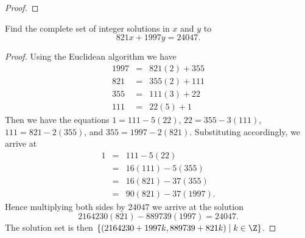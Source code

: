 \documentclass[10pt]{amsart}
\begin{document}
\begin{thm}
\begin{proof}
  \end{proof}
\end{thm}

\begin{thm}\label{ex4}
  Find the complete set of integer solutions in $x$ and $y$ to
  $$821x + 1997y = 24047.$$

  \begin{proof}
    Using the Euclidean algorithm we have
    \begin{eqnarray*}
      1997 &=& 821(2) + 355\\
      821 &=& 355(2) + 111\\
      355 &=& 111(3) + 22\\
      111 &=& 22(5) + 1
    \end{eqnarray*}
    Then we have the equations $1 = 111 - 5(22)$, $22 = 355 - 3(111)$, $111 = 821 - 2(355)$, and $355 = 1997 - 2(821)$.
    Substituting accordingly, we arrive at
    \begin{eqnarray*}
      1 &=& 111 - 5(22)\\
      &=& 16(111) - 5(355)\\
      &=& 16(821) - 37(355)\\
      &=& 90(821) - 37(1997).
    \end{eqnarray*}
    Hence multiplying both sides by $24047$ we arrive at the solution 
    $$2164230(821) - 889739(1997) = 24047.$$
    The solution set is then $\left\{(2164230 + 1997k, 889739 + 821k) \;\middle\vert\; k \in \Z\right\}$.
  \end{proof}
\end{thm}
\end{document}
